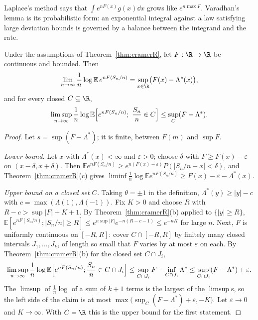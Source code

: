 Laplace's method says that $\int e^{nF(x)}g(x)\dd x$ grows like $e^{n\max F}$. Varadhan's lemma is its probabilistic form: an exponential integral against a law satisfying
large deviation bounds is governed by a balance between the integrand and the rate.

\begin{theorem}\label{thm:varadhan}
Under the assumptions of Theorem~\ref{thm:cramerR}, let $F:\R\to\R$ be continuous and bounded. Then
\[
\lim_{n\to\infty}\frac1n\log\mathbb E\,e^{nF(S_n/n)}=\sup_{x\in\R}\bigl(F(x)-\Lambda^*(x)\bigr),
\]
and for every closed $C\subseteq\R$,
\[
\limsup_{n\to\infty}\frac1n\log\mathbb E\Bigl[e^{nF(S_n/n)};\ \frac{S_n}n\in C\Bigr]\le\sup_C(F-\Lambda^*).
\]
\end{theorem}
\begin{proof}
Let $s=\sup(F-\Lambda^*)$; it is finite, between $F(m)$ and $\sup F$.

\emph{Lower bound.} Let $x$ with $\Lambda^*(x)<\infty$ and $\varepsilon>0$; choose $\delta$ with $F\ge F(x)-\varepsilon$ on $(x-\delta,x+\delta)$. Then
$\mathbb Ee^{nF(S_n/n)}\ge e^{n(F(x)-\varepsilon)}P(|S_n/n-x|<\delta)$, and Theorem~\ref{thm:cramerR}(c) gives $\liminf\frac1n\log\mathbb Ee^{nF(S_n/n)}\ge F(x)-\varepsilon-\Lambda^*(x)$.

\emph{Upper bound on a closed set $C$.} Taking $\theta=\pm1$ in the definition, $\Lambda^*(y)\ge|y|-c$ with $c=\max(\Lambda(1),\Lambda(-1))$. Fix $K>0$ and choose $R$ with $R-c>\sup|F|+K+1$.
By Theorem~\ref{thm:cramerR}(b) applied to $\{|y|\ge R\}$, $\mathbb E[e^{nF(S_n/n)};|S_n/n|\ge R]\le e^{n\sup|F|}e^{-n(R-c-1)}\le e^{-nK}$ for large $n$. Next, $F$ is uniformly
continuous on $[-R,R]$: cover $C\cap[-R,R]$ by finitely many closed intervals $J_1,\dots,J_k$, of length so small that $F$ varies by at most $\varepsilon$ on each. By Theorem~\ref{thm:cramerR}(b) for the
closed set $C\cap J_i$,
\[
\limsup_{n\to\infty}\frac1n\log\mathbb E\Bigl[e^{nF(S_n/n)};\frac{S_n}n\in C\cap J_i\Bigr]\le\sup_{C\cap J_i}F-\inf_{C\cap J_i}\Lambda^*\le\sup_{C\cap J_i}(F-\Lambda^*)+\varepsilon.
\]
The $\limsup$ of $\frac1n\log$ of a sum of $k+1$ terms is the largest of the $\limsup$s, so the left side of the claim is at most $\max\bigl(\sup_C(F-\Lambda^*)+\varepsilon,-K\bigr)$. Let
$\varepsilon\to0$ and $K\to\infty$. With $C=\R$ this is the upper bound for the first statement.
\end{proof}

